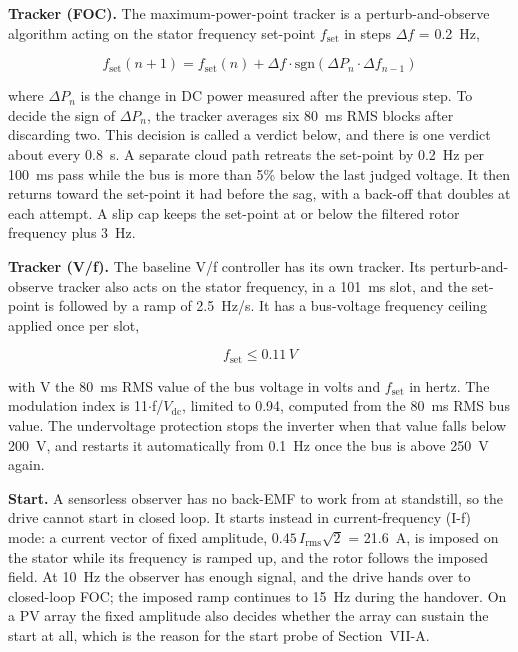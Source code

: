 \documentclass[journal]{IEEEtran}
\begin{document}
\textbf{Tracker (FOC).} The maximum-power-point tracker is a perturb-and-observe algorithm \cite{r10,r11,r23} acting on the stator frequency set-point $f_{\mathrm{set}}$ in steps $\Delta f$ = 0.2~Hz,

\begin{equation}
f_{\mathrm{set}}(n+1) = f_{\mathrm{set}}(n) + \Delta f \cdot \mathrm{sgn}\!\left(\Delta P_n \cdot \Delta f_{n-1}\right)
\label{eq:2}
\end{equation}

where $\Delta P_n$ is the change in DC power measured after the previous step. To decide the sign of $\Delta P_n$, the tracker averages six 80~ms RMS blocks after discarding two. This decision is called a verdict below, and there is one verdict about every 0.8~s. A separate cloud path retreats the set-point by 0.2~Hz per 100~ms pass while the bus is more than 5\% below the last judged voltage. It then returns toward the set-point it had before the sag, with a back-off that doubles at each attempt. A slip cap keeps the set-point at or below the filtered rotor frequency plus 3~Hz.

\textbf{Tracker (V/f).} The baseline V/f controller has its own tracker. Its perturb-and-observe tracker also acts on the stator frequency, in a 101~ms slot, and the set-point is followed by a ramp of 2.5~Hz/s. It has a bus-voltage frequency ceiling applied once per slot,

\begin{equation}
f_{\mathrm{set}} \le 0.11\,V
\label{eq:3}
\end{equation}

with V the 80~ms RMS value of the bus voltage in volts and $f_{\mathrm{set}}$ in hertz. The modulation index is 11$\cdot$f/$V_{\mathrm{dc}}$, limited to 0.94, computed from the 80~ms RMS bus value. The undervoltage protection stops the inverter when that value falls below 200~V, and restarts it automatically from 0.1~Hz once the bus is above 250~V again.

\textbf{Start.} A sensorless observer has no back-EMF to work from at standstill, so the drive cannot start in closed loop. It starts instead in current-frequency (I-f) mode: a current vector of fixed amplitude, $0.45\,I_{\mathrm{rms}}\sqrt{2}$ = 21.6~A, is imposed on the stator while its frequency is ramped up, and the rotor follows the imposed field. At 10~Hz the observer has enough signal, and the drive hands over to closed-loop FOC; the imposed ramp continues to 15~Hz during the handover. On a PV array the fixed amplitude also decides whether the array can sustain the start at all, which is the reason for the start probe of Section~VII-A.
\end{document}
